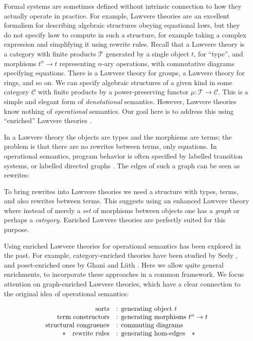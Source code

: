 \documentclass{amsart}
\theoremstyle{definition}
\newcommand{\C}{\mathscr{C}}
\newcommand{\T}{\mathscr{T}}
\newcommand{\maps}{\colon}
\begin{document}
Formal systems are sometimes defined without intrinsic connection to how they actually operate in practice.   For example, Lawvere theories  \cite{lawvere} are an excellent formalism for describing algebraic structures obeying equational laws, but they do not specify how to compute 
in such a structure, for example taking a complex expression and simplifying it using rewrite rules.   Recall that a Lawvere theory is a category with finite products $\T$ generated by a single object $t$, for ``type'', and morphisms $t^n \to t$ representing $n$-ary operations, with commutative diagrams specifying equations.   There is a Lawvere theory for groups, a Lawvere theory for rings, and so on.   We can specify algebraic structures of a given kind in some category $\C$ with finite products by a power-preserving functor $\mu \maps\T \to \C$.   This is a simple and elegant form of \emph{denotational} semantics.    However, Lawvere theories know nothing of \emph{operational} semantics.  Our goal here is to address this using ``enriched'' Lawvere theories \cite{enrich}.

In a Lawvere theory the objects are types and the morphisms are terms; the problem is that
there are no rewrites between terms, only equations.   In operational semantics, program behavior is often specified by labelled transition systems, or labelled directed graphs \cite{sos}.  The edges of such a graph can be seen as rewrites:
\begin{center}\end{center}
To bring rewrites into Lawvere theories we need a structure with types, terms, and also rewrites
between terms.   This suggests using an enhanced Lawvere theory where instead of merely
a \emph{set} of morphisms between objects one has a \emph{graph} or perhaps a \emph{category}. Enriched Lawvere theories are perfectly suited for this purpose.

Using enriched Lawvere theories for operational semantics has been explored in the past. For example, category-enriched theories have been studied by Seely \cite{seely}, and poset-enriched ones by Ghani and L\"uth \cite{ghani}.  Here we allow quite general enrichments, to incorporate these approaches in a common framework.  We focus attention on graph-enriched Lawvere theories, which have a clear connection to the original idea of operational semantics:

\[\begin{array}{rl}
\text{sorts} & \text{: generating object } t\\
\text{term constructors} & \text{: generating morphisms } t^n \to t\\
\text{structural congruence} & \text{: commuting diagrams}\\
\text{\textasteriskcentered \quad rewrite rules} & \text{: generating hom-edges\quad\textasteriskcentered}\\
\end{array}\]
\end{document}
